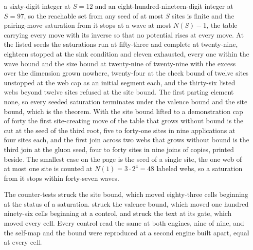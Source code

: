 \begin{chproof}[census]
a sixty-digit integer at $S = 12$ and an eight-hundred-nineteen-digit integer at $S = 97$, so the reachable set from any seed of at most $S$ sites is finite and the pairing-move saturation from it stops at a wave at most $N(S) - 1$, the table carrying every move with its inverse so that no potential rises at every move. At the listed seeds the saturations run at fifty-three and complete at twenty-nine, eighteen stopped at the sink condition and eleven exhausted, every one within the wave bound and the size bound at twenty-nine of twenty-nine with the excess over the dimension grown nowhere, twenty-four at the check bound of twelve sites unstopped at the web cap as an initial segment each, and the thirty-six listed webs beyond twelve sites refused at the site bound. The first parting element none, so every seeded saturation terminates under the valence bound and the site bound, which is the theorem. With the site bound lifted to a demonstration cap of forty the first site-creating move of the table that grows without bound is the cut at the seed of the third root, five to forty-one sites in nine applications at four sites each, and the first join across two webs that grows without bound is the third join at the gluon seed, four to forty sites in nine joins of copies, printed beside. The smallest case on the page is the seed of a single site, the one web of at most one site is counted at $N(1) = 3\cdot 2^{4} = 48$ labeled webs, so a saturation from it stops within forty-seven waves.

The counter-tests struck the site bound, which moved eighty-three cells beginning at the status of a saturation. struck the valence bound, which moved one hundred ninety-six cells beginning at a control, and struck the text at its gate, which moved every cell. Every control read the same at both engines, nine of nine, and the self-map and the bound were reproduced at a second engine built apart, equal at every cell.
\end{chproof}
